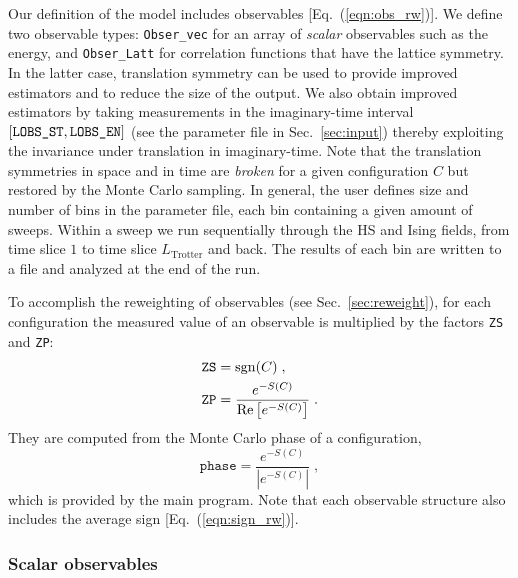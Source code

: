 Our definition  of the model includes observables [Eq.~(\ref{eqn:obs_rw})]. We define two observable types: \texttt{Obser\_vec}  for an array of \emph{scalar} observables
such as the energy, and  \texttt{Obser\_Latt}   for correlation functions that have the lattice symmetry. In the latter case, translation symmetry can be used to provide improved estimators and to reduce the size of the output.   
We also obtain improved estimators by taking measurements in the imaginary-time interval $[\texttt{LOBS\_ST},\texttt{LOBS\_EN\texttt{}}]$ (see the parameter file in Sec.~\ref{sec:input}) thereby exploiting the invariance under translation in imaginary-time.
Note that the translation symmetries  in space and in time are \emph{broken} for a given  configuration $C$ but restored by the Monte Carlo sampling. 
In general, the user defines size and number of bins in the parameter file, each bin containing a given amount of sweeps. Within a sweep we run sequentially through the HS and Ising fields, from time slice $1$ to time slice $L_{\text{Trotter}}$ and back.  The results of each bin are written to a file  and analyzed at the end of the run.     

To accomplish the reweighting of observables (see Sec.~\ref{sec:reweight}), for each configuration the measured value of an observable is multiplied by the factors \texttt{ZS} and \texttt{ZP}:
\begin{align}
\texttt{ZS} &= \operatorname{sgn}(C)\;, \\
\texttt{ZP} &= \frac{e^{-S(C)}} {\operatorname{Re} \left[e^{-S(C)} \right]}\;.
\end{align}
They are computed from the Monte Carlo phase of a configuration,
\begin{equation}\label{eqn:phase}
	\texttt{phase}   =   \frac{e^{-S(C)}}{ \left| e^{-S(C) }\right| }\;,
\end{equation}
which is provided by the main program.
Note that each observable structure also includes the average sign [Eq.~(\ref{eqn:sign_rw})].

\subsubsection{Scalar observables}

